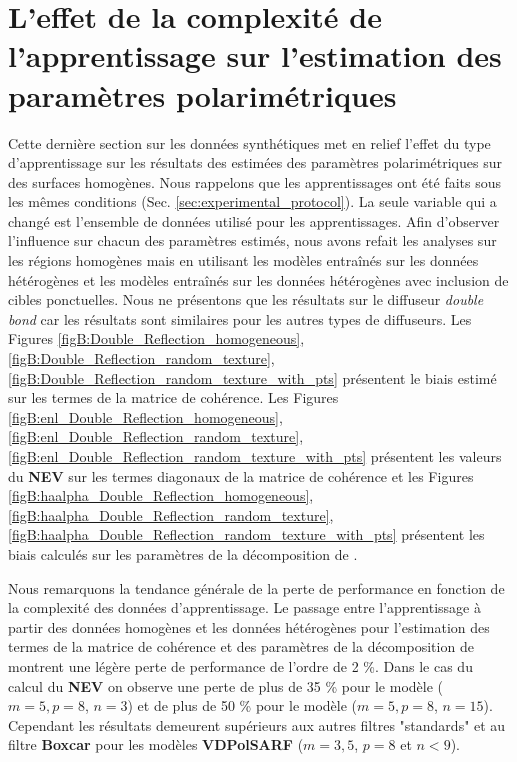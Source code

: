\section{L'effet de la complexité de l'apprentissage sur l'estimation des paramètres polarimétriques}
Cette dernière section sur les données synthétiques met en relief l'effet du type d'apprentissage sur les résultats des estimées des paramètres polarimétriques sur des surfaces homogènes. Nous rappelons que les apprentissages ont été faits sous les mêmes conditions (Sec. \ref{sec:experimental_protocol}). La seule variable qui a changé est l'ensemble de données utilisé pour les apprentissages.  Afin d'observer l'influence sur chacun des paramètres estimés, nous avons refait les analyses sur les régions homogènes mais en utilisant les modèles entraînés sur les données hétérogènes et les modèles entraînés sur les données hétérogènes avec inclusion de cibles ponctuelles.  Nous ne présentons que les résultats sur le diffuseur \textit{double bond} car les résultats sont similaires pour les autres types de diffuseurs.  Les Figures \ref{figB:Double_Reflection_homogeneous}, \ref{figB:Double_Reflection_random_texture}, \ref{figB:Double_Reflection_random_texture_with_pts} présentent le biais estimé sur les termes de la matrice de cohérence.   Les Figures \ref{figB:enl_Double_Reflection_homogeneous}, \ref{figB:enl_Double_Reflection_random_texture}, \ref{figB:enl_Double_Reflection_random_texture_with_pts} présentent les valeurs du \textbf{NEV} sur les termes diagonaux de la matrice de cohérence et les Figures \ref{figB:haalpha_Double_Reflection_homogeneous}, \ref{figB:haalpha_Double_Reflection_random_texture}, \ref{figB:haalpha_Double_Reflection_random_texture_with_pts} présentent les biais calculés sur les paramètres de la décomposition de \haalpha.

Nous remarquons la tendance générale de la perte de performance en fonction de la complexité des données d'apprentissage. Le passage entre l'apprentissage à partir des données homogènes et les données hétérogènes pour l'estimation des termes de la matrice de cohérence et des paramètres de la décomposition de \halpha montrent une légère perte de performance de l'ordre de 2 \%.  Dans le cas du calcul du \textbf{NEV} on observe une perte de plus de 35 \% pour le modèle ($m=5, p=8$, $n=3$) et de plus de 50 \% pour le modèle ($m=5, p=8$, $n=15$).  Cependant les résultats demeurent supérieurs aux autres filtres "standards" et au filtre \textbf{Boxcar} pour les modèles \textbf{VDPolSARF} ($m=3,5$, $p=8$ et $n < 9$).

